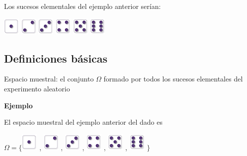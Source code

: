 \documentclass[]{book}
\begin{document}
Los sucesos elementales del ejemplo anterior serían:

\includegraphics{Images/proba1dibujos/dice/1.png} \includegraphics{Images/proba1dibujos/dice/2.png} \includegraphics{Images/proba1dibujos/dice/3.png} \includegraphics{Images/proba1dibujos/dice/4.png} \includegraphics{Images/proba1dibujos/dice/5.png} \includegraphics{Images/proba1dibujos/dice/6.png}

\hypertarget{definiciones-buxe1sicas}{%
\subsection{Definiciones básicas}\label{definiciones-buxe1sicas}}

 Espacio muestral: el conjunto \(\Omega\) formado por todos los sucesos elementales del experimento aleatorio

\textbf{Ejemplo}

El espacio muestral del ejemplo anterior del dado es

\(\Omega=\Big\{\)\includegraphics{Images/proba1dibujos/dice/1.png} ,
\includegraphics{Images/proba1dibujos/dice/2.png} ,
\includegraphics{Images/proba1dibujos/dice/3.png} ,
\includegraphics{Images/proba1dibujos/dice/4.png} ,
\includegraphics{Images/proba1dibujos/dice/5.png} ,
\includegraphics{Images/proba1dibujos/dice/6.png} \(\Big\}\)
\end{document}
